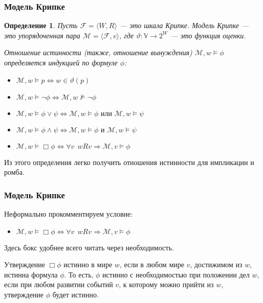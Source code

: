 \documentclass[pdf,utf8,russian,aspectratio=169]{beamer}
\newtheorem{defin}{Определение}
\begin{document}
\begin{frame}
  \frametitle{Модель Крипке}
\begin{defin}
  Пусть $\mathcal{F} = \langle W, R \rangle$ --- это шкала Крипке. Модель Крипке --- это упорядоченная пара $\mathcal{M} = \langle \mathcal{F}, v \rangle$, где $\vartheta : \mathbb{V} \to 2^{W}$ --- это функция оценки.

  Отношение истинности (также, отношение вынуждения) $\mathcal{M}, w \models \phi$ определяется индукцией по формуле $\phi$:

  \begin{itemize}
    \item $\mathcal{M}, w \models p \Leftrightarrow w \in \vartheta(p)$
    \item $\mathcal{M}, w \models \neg \phi \Leftrightarrow \mathcal{M}, w\not\models \neg \phi$
    \item $\mathcal{M}, w \models \phi \lor \psi \Leftrightarrow \mathcal{M}, w \models \phi \text{ или } \mathcal{M}, w \models \psi$
    \item $\mathcal{M}, w \models \phi \land \psi \Leftrightarrow \mathcal{M}, w \models \phi \text{ и } \mathcal{M}, w \models \psi$
    \item $\mathcal{M}, w \models \Box \phi \Leftrightarrow \forall v \:\: w R v \Rightarrow \mathcal{M}, v \models \phi$
  \end{itemize}
\end{defin}

Из этого определения легко получить отношения истинности для импликации и ромба.
\end{frame}

\begin{frame}
  \frametitle{Модель Крипке}

  Неформально прокомментируем условие:
  \begin{itemize}
  \item $\mathcal{M}, w \models \Box \phi \Leftrightarrow \forall v \:\: w R v \Rightarrow \mathcal{M}, v \models \phi$
  \end{itemize}

  Здесь бокс удобнее всего читать через необходимость.

  Утверждение $\Box \phi$ истинно в мире $w$, если в любом мире $v$, достижимом из $w$, истинна формула $\phi$. То есть, $\phi$ истинно с необходимостью при положении дел $w$, если при любом развитии событий $v$, к которому можно прийти из $w$, утверждение $\phi$ будет истинно.

\end{frame}
\end{document}
